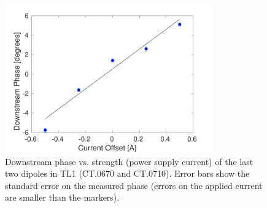 
\begin{figure}
  \centering
  \includegraphics[width=0.8\textwidth]{Figures/propagation/tl1670}
  \caption{Downstream phase vs. strength (power supply current) of the last two dipoles in TL1 (CT.0670 and CT.0710). Error bars show the standard error on the measured phase (errors on the applied current are smaller than the markers).}
  \label{f:tl1670}
\end{figure}



